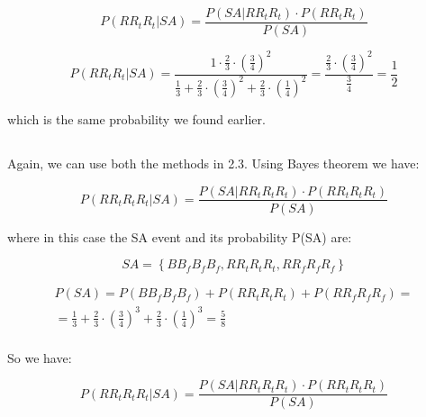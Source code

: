 \documentclass{article}
\begin{document}
\begin{equation} \label{eq:bayesSameAnswer}
P(RR_{t}R_{t} | SA) = \frac { P(SA | RR_{t}R_{t}) \cdot P(RR_{t}R_{t}) } { P(SA) } 
\end{equation}

\begin{equation} \label{eq:bayesSameAnswer2}
P(RR_{t}R_{t} | SA) =  \frac { 1 \cdot \frac {2}{3} \cdot \left( \frac{3}{4} \right)^{2} } { \frac {1}{3} + \frac{2}{3} \cdot \left( \frac {3}{4} \right)^2 + \frac {2}{3} \cdot \left( \frac {1}{4} \right)^{2} } 
	= \frac { \frac {2}{3} \cdot \left ( \frac {3}{4} \right )^{2} } {\frac {3}{4}} =		\frac {1} {2}
\end{equation}

which is the same probability we found earlier.



\subsection{}
Again, we can use both the methods in 2.3. Using Bayes theorem we have:

\begin{equation} \label{eq:bayesSameAnswer4}
P(RR_{t}R_{t}R_{t} | SA) = \frac { P(SA | RR_{t}R_{t}R_{t}) \cdot P(RR_{t}R_{t}R_{t}) } { P(SA) } 
\end{equation}

where in this case the SA event and its probability P(SA) are:

\begin{equation} \label{eq:sameanswer4}
SA = \left\{ {BB_{f}B_{f}B_{f}, RR_{t}R_{t}R_{t}, RR_{f}R_{f}R_{f}} \right\}
\end{equation}

\begin{equation} \label{eq:sameanswerprob4}
\begin{split}
P(SA) = P(BB_{f}B_{f}B_{f}) + P(RR_{t}R_{t}R_{t}) + P(RR_{f}R_{f}R_{f}) = \\
= \frac {1}{3} + \frac{2}{3} \cdot \left( \frac {3}{4} \right)^{3} + \frac {2}{3} \cdot \left( \frac {1}{4} \right)^{3} = \frac {5}{8} \\
\end{split}
\end{equation} 

So we have:

\begin{equation} \label{eq:bayesSameAnswer4.2}
P(RR_{t}R_{t}R_{t} | SA) = \frac { P(SA | RR_{t}R_{t}R_{t}) \cdot P(RR_{t}R_{t}R_{t}) } { P(SA) } 
\end{equation}
\end{document}

